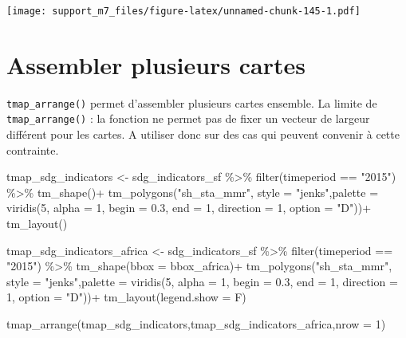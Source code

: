 \documentclass[
]{book}
\newenvironment{Shaded}{\begin{snugshade}}{\end{snugshade}}
\newcommand{\AttributeTok}[1]{\textcolor[rgb]{0.77,0.63,0.00}{#1}}
\newcommand{\DecValTok}[1]{\textcolor[rgb]{0.00,0.00,0.81}{#1}}
\newcommand{\FloatTok}[1]{\textcolor[rgb]{0.00,0.00,0.81}{#1}}
\newcommand{\FunctionTok}[1]{\textcolor[rgb]{0.00,0.00,0.00}{#1}}
\newcommand{\NormalTok}[1]{#1}
\newcommand{\OtherTok}[1]{\textcolor[rgb]{0.56,0.35,0.01}{#1}}
\newcommand{\SpecialCharTok}[1]{\textcolor[rgb]{0.00,0.00,0.00}{#1}}
\newcommand{\StringTok}[1]{\textcolor[rgb]{0.31,0.60,0.02}{#1}}
\begin{document}
\texttt{[image: support\_m7\_files/figure-latex/unnamed-chunk-145-1.pdf]}

\hypertarget{assembler-plusieurs-cartes}{%
\section{Assembler plusieurs cartes}\label{assembler-plusieurs-cartes}}

\texttt{tmap\_arrange()} permet d'assembler plusieurs cartes ensemble. La limite de \texttt{tmap\_arrange()} : la fonction ne permet pas de fixer un vecteur de largeur différent pour les cartes. A utiliser donc sur des cas qui peuvent convenir à cette contrainte.

\begin{Shaded}
\begin{Highlighting}[]
\NormalTok{tmap\_sdg\_indicators }\OtherTok{\textless{}{-}}\NormalTok{ sdg\_indicators\_sf }\SpecialCharTok{\%\textgreater{}\%}
  \FunctionTok{filter}\NormalTok{(timeperiod }\SpecialCharTok{==} \StringTok{"2015"}\NormalTok{) }\SpecialCharTok{\%\textgreater{}\%}
  \FunctionTok{tm\_shape}\NormalTok{()}\SpecialCharTok{+}
  \FunctionTok{tm\_polygons}\NormalTok{(}\StringTok{"sh\_sta\_mmr"}\NormalTok{, }\AttributeTok{style =} \StringTok{"jenks"}\NormalTok{,}\AttributeTok{palette =} \FunctionTok{viridis}\NormalTok{(}\DecValTok{5}\NormalTok{, }\AttributeTok{alpha =} \DecValTok{1}\NormalTok{, }\AttributeTok{begin =} \FloatTok{0.3}\NormalTok{, }\AttributeTok{end =} \DecValTok{1}\NormalTok{, }\AttributeTok{direction =} \DecValTok{1}\NormalTok{, }\AttributeTok{option =} \StringTok{"D"}\NormalTok{))}\SpecialCharTok{+}
  \FunctionTok{tm\_layout}\NormalTok{()}

\NormalTok{tmap\_sdg\_indicators\_africa }\OtherTok{\textless{}{-}}\NormalTok{ sdg\_indicators\_sf }\SpecialCharTok{\%\textgreater{}\%}
  \FunctionTok{filter}\NormalTok{(timeperiod }\SpecialCharTok{==} \StringTok{"2015"}\NormalTok{) }\SpecialCharTok{\%\textgreater{}\%}
  \FunctionTok{tm\_shape}\NormalTok{(}\AttributeTok{bbox =}\NormalTok{ bbox\_africa)}\SpecialCharTok{+}
  \FunctionTok{tm\_polygons}\NormalTok{(}\StringTok{"sh\_sta\_mmr"}\NormalTok{, }\AttributeTok{style =} \StringTok{"jenks"}\NormalTok{,}\AttributeTok{palette =} \FunctionTok{viridis}\NormalTok{(}\DecValTok{5}\NormalTok{, }\AttributeTok{alpha =} \DecValTok{1}\NormalTok{, }\AttributeTok{begin =} \FloatTok{0.3}\NormalTok{, }\AttributeTok{end =} \DecValTok{1}\NormalTok{, }\AttributeTok{direction =} \DecValTok{1}\NormalTok{, }\AttributeTok{option =} \StringTok{"D"}\NormalTok{))}\SpecialCharTok{+}
  \FunctionTok{tm\_layout}\NormalTok{(}\AttributeTok{legend.show =}\NormalTok{ F)}

\FunctionTok{tmap\_arrange}\NormalTok{(tmap\_sdg\_indicators,tmap\_sdg\_indicators\_africa,}\AttributeTok{nrow =} \DecValTok{1}\NormalTok{)}
\end{Highlighting}
\end{Shaded}
\end{document}
